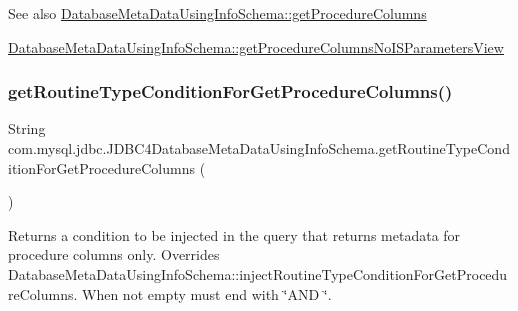 \begin{DoxySeeAlso}{See also}
\mbox{\hyperlink{classcom_1_1mysql_1_1jdbc_1_1_database_meta_data_using_info_schema_a2bb17e6501848d501ed65ee886ed4225}{Database\+Meta\+Data\+Using\+Info\+Schema\+::get\+Procedure\+Columns}} 

\mbox{\hyperlink{classcom_1_1mysql_1_1jdbc_1_1_database_meta_data_using_info_schema_a39f4d86800a2ecfb0e22a88485a92aae}{Database\+Meta\+Data\+Using\+Info\+Schema\+::get\+Procedure\+Columns\+No\+I\+S\+Parameters\+View}} 
\end{DoxySeeAlso}
\mbox{\label{classcom_1_1mysql_1_1jdbc_1_1_j_d_b_c4_database_meta_data_using_info_schema_a1424ef7c87eba487fe66355836863d8e}} 
\subsubsection{\texorpdfstring{get\+Routine\+Type\+Condition\+For\+Get\+Procedure\+Columns()}{getRoutineTypeConditionForGetProcedureColumns()}}
{\footnotesize\ttfamily String com.\+mysql.\+jdbc.\+J\+D\+B\+C4\+Database\+Meta\+Data\+Using\+Info\+Schema.\+get\+Routine\+Type\+Condition\+For\+Get\+Procedure\+Columns (\begin{DoxyParamCaption}{ }\end{DoxyParamCaption})\hspace{0.3cm}{\ttfamily [protected]}}

Returns a condition to be injected in the query that returns metadata for procedure columns only. Overrides Database\+Meta\+Data\+Using\+Info\+Schema\+::inject\+Routine\+Type\+Condition\+For\+Get\+Procedure\+Columns. When not empty must end with \char`\"{}\+A\+N\+D \char`\"{}.

